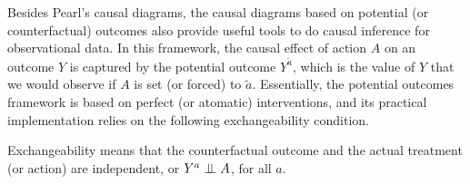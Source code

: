 Besides Pearl's causal diagrams, the causal diagrams based on potential (or counterfactual) outcomes also provide useful tools to do causal inference for 
observational data.
In this framework, the causal effect of action $A$ on an outcome $Y$ is captured by 
the potential outcome $Y^{\tilde{a}}$, which is the value of $Y$ that we would observe if $A$ is set (or forced) to $\tilde{a}$.  Essentially, the potential outcomes framework 
is based on perfect (or atomatic) interventions, and its practical implementation relies on the following exchangeability condition.

\begin{Def}[Exchangeability]
	Exchangeability means that the counterfactual outcome and the actual treatment (or action) are independent, or $Y^a \perp\mkern-9.5mu\perp A$, for all $a$.
\end{Def}


 


